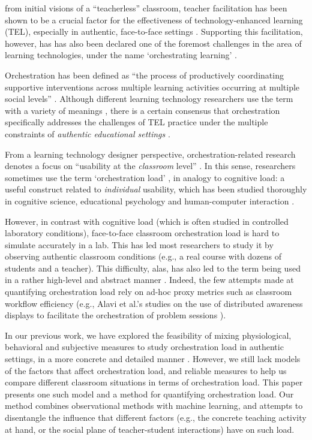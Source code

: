 \documentclass[10pt,journal,compsoc]{IEEEtran}
\begin{document}

 from initial visions of a ``teacherless'' classroom, teacher facilitation has been shown to be a crucial factor for the effectiveness of technology-enhanced learning (TEL), especially in authentic, face-to-face settings \cite{Gomez2013,Onrubia2012}. Supporting this facilitation, however, has has also been declared one of the foremost challenges in the area of learning technologies, under the name `orchestrating learning' \cite{STELLARorch}. 

Orchestration has been defined as ``the process of productively coordinating supportive interventions across multiple learning activities occurring at multiple social levels'' \cite{Dillenbourg2009}. Although different learning technology researchers use the term with a variety of meanings \cite{Prieto2011}, there is a certain consensus that orchestration specifically addresses the challenges of TEL practice under the multiple constraints of \textit{authentic educational settings} \cite{Roschelle2013}.

From a learning technology designer perspective, orchestration-related research denotes a focus on ``usability at the \textit{classroom} level'' \cite{Dillenbourg2011}. In this sense, researchers sometimes use the term `orchestration load' \cite{Dillenbourg2013,Cuendet2013,munoz2013sharing}, in analogy to cognitive load: a useful construct related to \textit{individual} usability, which has been studied thoroughly in cognitive science, educational psychology and human-computer interaction \cite{sweller1994cognitive,oviatt2006human}.

However, in contrast with cognitive load (which is often studied in controlled laboratory conditions), face-to-face classroom orchestration load is hard to simulate accurately in a lab. This has led most researchers to study it by observing authentic classroom conditions (e.g., a real course with dozens of students and a teacher). This difficulty, alas, has also led to the term being used in a rather high-level and abstract manner \cite{Dillenbourg2013,Cuendet2013}. Indeed, the few attempts made at quantifying orchestration load rely on ad-hoc proxy metrics such as classroom workflow efficiency (e.g., Alavi et al.'s studies on the use of distributed awareness displays to facilitate the orchestration of problem sessions \cite{Alavi2012}).

In our previous work, we have explored the feasibility of mixing physiological, behavioral and subjective measures to study orchestration load in authentic settings, in a more concrete and detailed manner \cite{Prieto2015ectel}. However, we still lack models of the factors that affect orchestration load, and reliable measures to help us compare different classroom situations in terms of orchestration load. This paper presents one such model and a method for quantifying orchestration load. Our method combines observational methods with machine learning, and attempts to disentangle the influence that different factors (e.g., the concrete teaching activity at hand, or the social plane of teacher-student interactions) have on such load.
\end{document}
